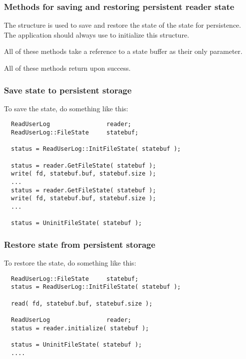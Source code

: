\subsubsection{Methods for saving and restoring persistent reader state}

The  structure is used to save and
restore the state of the  state for persistence.  The
application should always use  to initialize this
structure.

All of these methods take a reference to a state buffer
as their only parameter.

All of these methods return  upon success.

\subsubsection{Save state to persistent storage}
To save the state, do something like this:
\footnotesize
\begin{verbatim}
  ReadUserLog                reader;
  ReadUserLog::FileState     statebuf;

  status = ReadUserLog::InitFileState( statebuf );

  status = reader.GetFileState( statebuf );
  write( fd, statebuf.buf, statebuf.size );
  ...
  status = reader.GetFileState( statebuf );
  write( fd, statebuf.buf, statebuf.size );
  ...

  status = UninitFileState( statebuf );
\end{verbatim}
\normalsize

\subsubsection{Restore state from persistent storage}
To restore the state, do something like this:
\footnotesize
\begin{verbatim}
  ReadUserLog::FileState     statebuf;
  status = ReadUserLog::InitFileState( statebuf );

  read( fd, statebuf.buf, statebuf.size );

  ReadUserLog                reader;
  status = reader.initialize( statebuf );

  status = UninitFileState( statebuf );
  ....
\end{verbatim}
\normalsize

